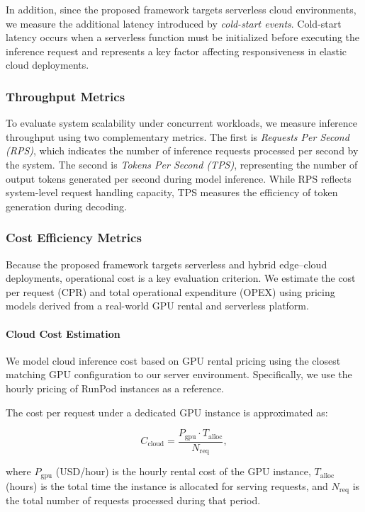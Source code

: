\documentclass[lettersize,journal]{IEEEtran}
\begin{document}
In addition, since the proposed framework targets serverless cloud environments, we measure the additional latency introduced by \textit{cold-start events}. Cold-start latency occurs when a serverless function must be initialized before executing the inference request and represents a key factor affecting responsiveness in elastic cloud deployments.

\subsubsection{Throughput Metrics}
To evaluate system scalability under concurrent workloads, we measure inference throughput using two complementary metrics. The first is \textit{Requests Per Second (RPS)}, which indicates the number of inference requests processed per second by the system. The second is \textit{Tokens Per Second (TPS)}, representing the number of output tokens generated per second during model inference. While RPS reflects system-level request handling capacity, TPS measures the efficiency of token generation during decoding.

\subsubsection{Cost Efficiency Metrics}
\label{sec:experiments:cost}
Because the proposed framework targets serverless and hybrid edge–cloud deployments, operational cost is a key evaluation criterion. We estimate the cost per request (CPR) and total operational expenditure (OPEX) using pricing models derived from a real-world GPU rental and serverless platform.

\paragraph{Cloud Cost Estimation}
We model cloud inference cost based on GPU rental pricing using the closest matching GPU configuration to our server environment. Specifically, we use the hourly pricing of RunPod instances as a reference.

The cost per request under a dedicated GPU instance is approximated as:

\begin{equation}
    C_{\text{cloud}} = \frac{P_{\text{gpu}} \cdot T_{\text{alloc}}}{N_{\text{req}}},
\end{equation}

where $P_{\text{gpu}}$ (USD/hour) is the hourly rental cost of the GPU instance, $T_{\text{alloc}}$ (hours) is the total time the instance is allocated for serving requests, and $N_{\text{req}}$ is the total number of requests processed during that period.
\end{document}
